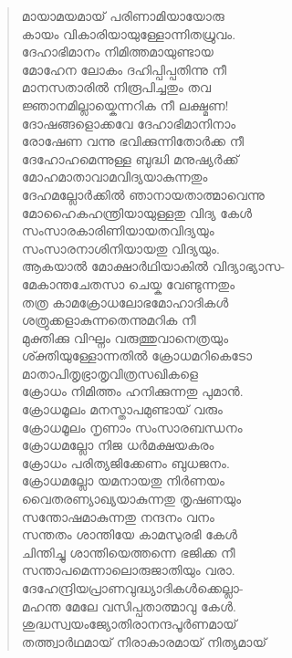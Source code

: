 \begin{verse}
മായാമയമായ് പരിണാമിയായോരു\\
കായം വികാരിയായുള്ളോന്നിതധ്രുവം.\\
ദേഹാഭിമാനം നിമിത്തമായുണ്ടായ\\
മോഹേന ലോകം ദഹിപ്പിപ്പതിന്നു നീ\\
മാനസതാരില്‍ നിരൂപിച്ചതും തവ\\
ജ്ഞാനമില്ലായ്കെന്നറിക നീ ലക്ഷ്മണ!\\
ദോഷങ്ങളൊക്കവേ ദേഹാഭിമാനിനാം\\
രോഷേണ വന്നു ഭവിക്കുന്നിതോര്‍ക്ക നീ\\
ദേഹോഹമെന്നുള്ള ബുദ്ധി മനുഷ്യര്‍ക്ക്\\
മോഹമാതാവാമവിദ്യയാകുന്നതും\\
ദേഹമല്ലോര്‍ക്കില്‍ ഞാനായതാത്മാവെന്നു\\
മോഹൈകഹന്ത്രിയായുള്ളതു വിദ്യ കേള്‍\\
സംസാരകാരിണിയായതവിദ്യയും\\
സംസാരനാശിനിയായതു വിദ്യയും.\\
ആകയാല്‍ മോക്ഷാര്‍ഥിയാകില്‍ വിദ്യാഭ്യാസ-\\
മേകാന്തചേതസാ ചെയ്ക വേണ്ടുന്നതും\\
തത്ര കാമക്രോധലോഭമോഹാദികള്‍\\
ശത്രുക്കളാകുന്നതെന്നുമറിക നീ\\
മുക്തിക്കു വിഘ്നം വരുത്തുവാനെത്രയും\\
ശ്ക്തിയുള്ളോന്നതില്‍ ക്രോധമറികെടോ\\
മാതാപിതൃഭ്രാതൃവിത്രസഖികളെ\\
ക്രോധം നിമിത്തം ഹനിക്കുന്നതു പുമാന്‍.\\
ക്രോധമൂലം മനസ്താപമുണ്ടായ് വരും\\
ക്രോധമൂലം നൃണാം സംസാരബന്ധനം\\
ക്രോധമല്ലോ നിജ ധര്‍മക്ഷയകരം\\
ക്രോധം പരിത്യജിക്കേണം ബുധജനം.\\
ക്രോധമല്ലോ യമനായതു നിര്‍ണയം\\
വൈതരണ്യാഖ്യയാകുന്നതു തൃഷണയും\\
സന്തോഷമാകുന്നതു നന്ദനം വനം\\
സന്തതം ശാന്തിയേ കാമസുരഭി കേള്‍\\
ചിന്തിച്ചു ശാന്തിയെത്തന്നെ ഭജിക്ക നീ\\
സന്താപമെന്നാലൊരുജാതിയും വരാ.\\
ദേഹേന്ദ്രിയപ്രാണവുദ്ധ്യാദികള്‍ക്കെല്ലാ-\\
മഹന്ത മേലേ വസിപ്പതാത്മാവു കേള്‍.\\
ശുദ്ധസ്വയംജ്യോതിരാനന്ദപൂര്‍ണമായ്\\
തത്ത്വാര്‍ഥമായ് നിരാകാരമായ് നിത്യമായ്\\

\end{verse}
